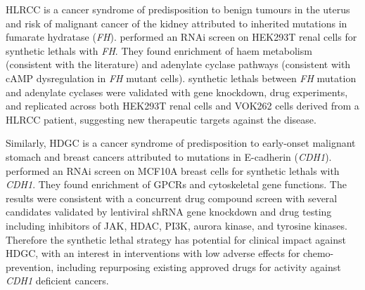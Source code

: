 \gls{HLRCC} is a cancer syndrome of predisposition to benign \glspl{tumour} in the uterus and risk of malignant cancer of the kidney attributed to inherited \glspl{mutation} in fumarate hydratase (\textit{FH}). \citet{Boettcher2014} performed an \gls{RNAi} screen on HEK293T renal cells for \glspl{synthetic lethal} with \textit{FH}. They found enrichment of haem metabolism (consistent with the literature) and adenylate cyclase pathways (consistent with \gls{cAMP} dysregulation in \textit{FH} \gls{mutant} cells). \Glspl{synthetic lethal} between \textit{FH} \gls{mutation} and adenylate cyclases were validated with gene knockdown, drug experiments, and replicated across both HEK293T renal cells and VOK262 cells derived from a \gls{HLRCC} patient, suggesting new therapeutic targets against the disease. %

Similarly, \gls{HDGC} is a cancer syndrome of predisposition to early-onset malignant stomach and breast cancers attributed to \glspl{mutation} in \gls{E-cadherin} (\textit{CDH1}). \citet{Telford2015} performed an \gls{RNAi} screen on MCF10A breast cells for \glspl{synthetic lethal} with \textit{CDH1}. They found enrichment of \glspl{GPCR} and cytoskeletal gene functions. The results were consistent with a concurrent drug compound screen with several candidates validated by lentiviral \gls{shRNA} gene knockdown and drug testing including inhibitors of \gls{JAK}, \gls{HDAC}, \gls{PI3K}, aurora kinase, and tyrosine kinases. Therefore the \gls{synthetic lethal} strategy has potential for clinical impact against \gls{HDGC}, with an interest in interventions with low adverse effects for chemo-prevention, including repurposing existing approved drugs for activity against \textit{CDH1} deficient cancers.  


